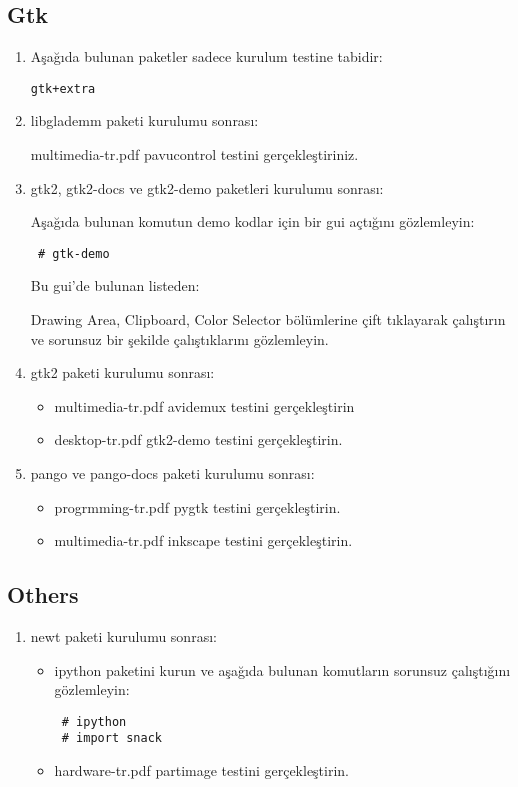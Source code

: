 \documentclass[a4paper,10pt]{article}
\begin{document}
\subsection*{Gtk}
\begin{enumerate}
\item Aşağıda bulunan paketler sadece kurulum testine tabidir:
\begin{verbatim}
gtk+extra
\end{verbatim}
\item libglademm paketi kurulumu sonrası:

multimedia-tr.pdf pavucontrol testini gerçekleştiriniz.
 
 \item gtk2, gtk2-docs ve gtk2-demo paketleri kurulumu sonrası: 

Aşağıda bulunan komutun demo kodlar için bir gui açtığını gözlemleyin:
\begin{verbatim}
 # gtk-demo
\end{verbatim}

Bu gui'de bulunan listeden:

Drawing Area, Clipboard, Color Selector bölümlerine çift tıklayarak çalıştırın ve sorunsuz bir şekilde çalıştıklarını gözlemleyin.

\item gtk2 paketi kurulumu sonrası: 
\begin{itemize}
 \item multimedia-tr.pdf avidemux testini gerçekleştirin
\item desktop-tr.pdf gtk2-demo testini gerçekleştirin.
\end{itemize}
\item pango ve pango-docs paketi kurulumu sonrası: 
\begin{itemize}
 \item progrmming-tr.pdf pygtk testini gerçekleştirin.
 \item multimedia-tr.pdf inkscape testini gerçekleştirin.
\end{itemize}

\end{enumerate}
\subsection*{Others}
\begin{enumerate}
 \item newt paketi kurulumu sonrası:
\begin{itemize}
 \item ipython paketini kurun ve aşağıda bulunan komutların sorunsuz çalıştığını gözlemleyin:
\begin{verbatim}
 # ipython
 # import snack
\end{verbatim}
  \item hardware-tr.pdf partimage testini gerçekleştirin.

\end{itemize}
 


\end{enumerate}
\end{document}
